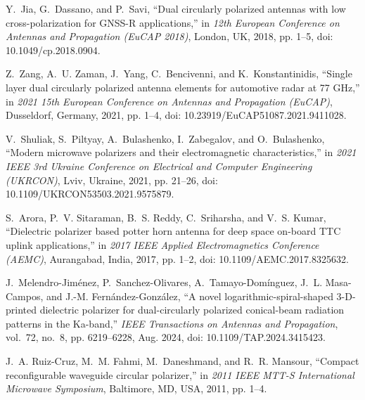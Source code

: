 \documentclass[journal]{IEEEtran}
\begin{document}
\begin{thebibliography}{99}
    
    Y.~Jia, G.~Dassano, and P.~Savi, ``Dual circularly polarized antennas with low cross-polarization for GNSS-R applications,'' in \emph{12th European Conference on Antennas and Propagation (EuCAP 2018)}, London, UK, 2018, pp. 1--5, doi: 10.1049/cp.2018.0904.

    Z.~Zang, A.~U. Zaman, J.~Yang, C.~Bencivenni, and K.~Konstantinidis, ``Single layer dual circularly polarized antenna elements for automotive radar at 77 GHz,'' in \emph{2021 15th European Conference on Antennas and Propagation (EuCAP)}, Dusseldorf, Germany, 2021, pp. 1--4, doi: 10.23919/EuCAP51087.2021.9411028.

    V.~Shuliak, S.~Piltyay, A.~Bulashenko, I.~Zabegalov, and O.~Bulashenko, ``Modern microwave polarizers and their electromagnetic characteristics,'' in \emph{2021 IEEE 3rd Ukraine Conference on Electrical and Computer Engineering (UKRCON)}, Lviv, Ukraine, 2021, pp. 21--26, doi: 10.1109/UKRCON53503.2021.9575879.

    S.~Arora, P.~V. Sitaraman, B.~S. Reddy, C.~Sriharsha, and V.~S. Kumar, ``Dielectric polarizer based potter horn antenna for deep space on-board TTC uplink applications,'' in \emph{2017 IEEE Applied Electromagnetics Conference (AEMC)}, Aurangabad, India, 2017, pp. 1--2, doi: 10.1109/AEMC.2017.8325632.

    J.~Melendro-Jiménez, P.~Sanchez-Olivares, A.~Tamayo-Domínguez, J.~L. Masa-Campos, and J.-M. Fernández-González, ``A novel logarithmic-spiral-shaped 3-D-printed dielectric polarizer for dual-circularly polarized conical-beam radiation patterns in the Ka-band,'' \emph{IEEE Transactions on Antennas and Propagation}, vol.~72, no.~8, pp. 6219--6228, Aug. 2024, doi: 10.1109/TAP.2024.3415423.

    J.~A. Ruiz-Cruz, M.~M. Fahmi, M.~Daneshmand, and R.~R. Mansour, ``Compact reconfigurable waveguide circular polarizer,'' in \emph{2011 IEEE MTT-S International Microwave Symposium}, Baltimore, MD, USA, 2011, pp. 1--4.


\end{thebibliography}
\end{document}
